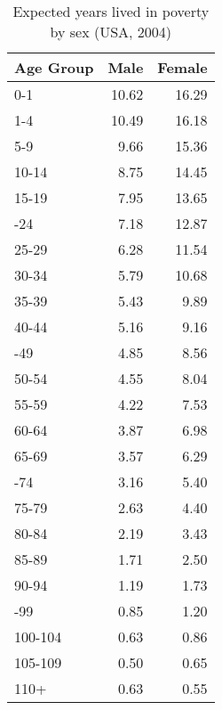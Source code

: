 \begin{table}

\caption{Expected years lived in poverty by sex (USA, 2004)}
\centering
\begin{tabular}[t]{lrr}
\toprule
Age Group & Male & Female\\
\midrule
0-1 & 10.62 & 16.29\\
1-4 & 10.49 & 16.18\\
5-9 & 9.66 & 15.36\\
10-14 & 8.75 & 14.45\\
15-19 & 7.95 & 13.65\\
\addlinespace
20-24 & 7.18 & 12.87\\
25-29 & 6.28 & 11.54\\
30-34 & 5.79 & 10.68\\
35-39 & 5.43 & 9.89\\
40-44 & 5.16 & 9.16\\
\addlinespace
45-49 & 4.85 & 8.56\\
50-54 & 4.55 & 8.04\\
55-59 & 4.22 & 7.53\\
60-64 & 3.87 & 6.98\\
65-69 & 3.57 & 6.29\\
\addlinespace
70-74 & 3.16 & 5.40\\
75-79 & 2.63 & 4.40\\
80-84 & 2.19 & 3.43\\
85-89 & 1.71 & 2.50\\
90-94 & 1.19 & 1.73\\
\addlinespace
95-99 & 0.85 & 1.20\\
100-104 & 0.63 & 0.86\\
105-109 & 0.50 & 0.65\\
110+ & 0.63 & 0.55\\
\bottomrule
\end{tabular}
\end{table}
